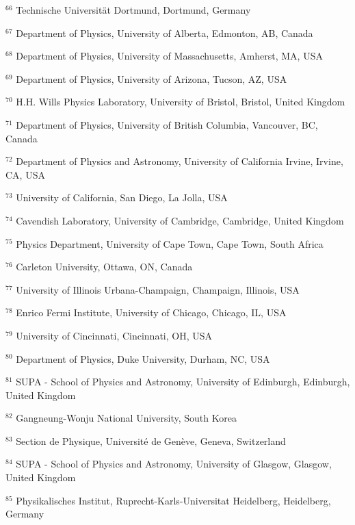 \par {\footnotesize $^{66}$ Technische Universit\"at Dortmund, Dortmund, Germany}
\par {\footnotesize $^{67}$ Department of Physics, University of Alberta, Edmonton, AB, Canada}
\par {\footnotesize $^{68}$ Department of Physics, University of Massachusetts, Amherst, MA, USA}
\par {\footnotesize $^{69}$ Department of Physics, University of Arizona, Tucson, AZ, USA}
\par {\footnotesize $^{70}$ H.H. Wills Physics Laboratory, University of Bristol, Bristol, United Kingdom}
\par {\footnotesize $^{71}$ Department of Physics, University of British Columbia, Vancouver, BC, Canada}
\par {\footnotesize $^{72}$ Department of Physics and Astronomy, University of California Irvine, Irvine, CA, USA}
\par {\footnotesize $^{73}$ University of California, San Diego, La Jolla, USA}
\par {\footnotesize $^{74}$ Cavendish Laboratory, University of Cambridge, Cambridge, United Kingdom}
\par {\footnotesize $^{75}$ Physics Department, University of Cape Town, Cape Town, South Africa}
\par {\footnotesize $^{76}$ Carleton University, Ottawa, ON, Canada}
\par {\footnotesize $^{77}$ University of Illinois Urbana-Champaign, Champaign, Illinois, USA}
\par {\footnotesize $^{78}$ Enrico Fermi Institute, University of Chicago, Chicago, IL, USA}
\par {\footnotesize $^{79}$ University of Cincinnati, Cincinnati, OH, USA}
\par {\footnotesize $^{80}$ Department of Physics, Duke University, Durham, NC, USA}
\par {\footnotesize $^{81}$ SUPA - School of Physics and Astronomy, University of Edinburgh, Edinburgh, United Kingdom}
\par {\footnotesize $^{82}$ Gangneung-Wonju National University, South Korea}
\par {\footnotesize $^{83}$ Section de Physique, Université de Genève, Geneva, Switzerland}
\par {\footnotesize $^{84}$ SUPA - School of Physics and Astronomy, University of Glasgow, Glasgow, United Kingdom}
\par {\footnotesize $^{85}$ Physikalisches Institut, Ruprecht-Karls-Universitat Heidelberg, Heidelberg, Germany}
